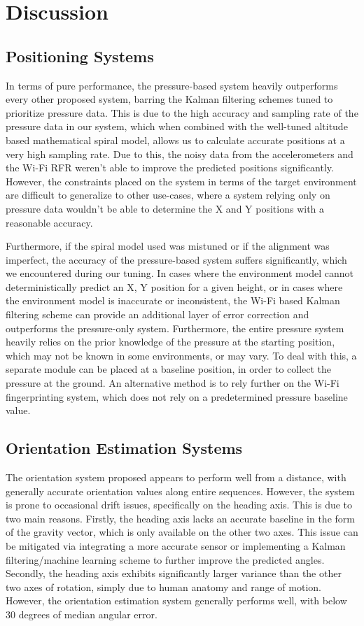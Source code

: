 \chapter{Discussion}

\section{Positioning Systems}
In terms of pure performance, the pressure-based system heavily outperforms every other proposed system, barring the Kalman filtering schemes tuned to prioritize pressure data. This is due to the high accuracy and sampling rate of the pressure data in our system, which when combined with the well-tuned altitude based mathematical spiral model, allows us to calculate accurate positions at a very high sampling rate. Due to this, the noisy data from the accelerometers and the Wi-Fi RFR weren't able to improve the predicted positions significantly. However, the constraints placed on the system in terms of the target environment are difficult to generalize to other use-cases, where a system relying only on pressure data wouldn't be able to determine the X and Y positions with a reasonable accuracy.
\par
Furthermore, if the spiral model used was mistuned or if the alignment was imperfect, the accuracy of the pressure-based system suffers significantly, which we encountered during our tuning. In cases where the environment model cannot deterministically predict an X, Y position for a given height, or in cases where the environment model is inaccurate or inconsistent, the Wi-Fi based Kalman filtering scheme can provide an additional layer of error correction and outperforms the pressure-only system. Furthermore, the entire pressure system heavily relies on the prior knowledge of the pressure at the starting position, which may not be known in some environments, or may vary. To deal with this, a separate module can be placed at a baseline position, in order to collect the pressure at the ground. An alternative method is to rely further on the Wi-Fi fingerprinting system, which does not rely on a predetermined pressure baseline value.

\section{Orientation Estimation Systems}
The orientation system proposed appears to perform well from a distance, with generally accurate orientation values along entire sequences. However, the system is prone to occasional drift issues, specifically on the heading axis. This is due to two main reasons. Firstly, the heading axis lacks an accurate baseline in the form of the gravity vector, which is only available on the other two axes. This issue can be mitigated via integrating a more accurate sensor or implementing a Kalman filtering/machine learning scheme to further improve the predicted angles. Secondly, the heading axis exhibits significantly larger variance than the other two axes of rotation, simply due to human anatomy and range of motion. However, the orientation estimation system generally performs well, with below 30 degrees of median angular error.